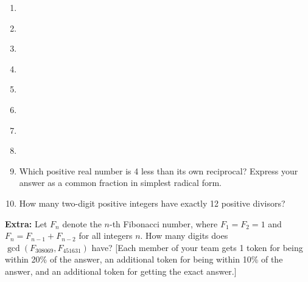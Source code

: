 \documentclass{article}
\begin{document}
\begin{enumerate}
\item \underline{\hspace{3in}}\vspace{1cm}
\item \underline{\hspace{3in}}\vspace{1cm}
\item \underline{\hspace{3in}}\vspace{1cm}
\item \underline{\hspace{3in}}\vspace{1cm}
\item \underline{\hspace{3in}}\vspace{1cm}
\item \underline{\hspace{3in}}\vspace{1cm}
\item \underline{\hspace{3in}}\vspace{1cm}
\item \underline{\hspace{3in}}\vspace{1cm}
\item Which positive real number is 4 less than its own reciprocal? Express your answer as a common fraction in simplest radical form.\vspace{1cm}
\item How many two-digit positive integers have exactly 12 positive divisors?
\end{enumerate}\vspace{1cm}

\textbf{Extra:} Let $F_n$ denote the $n$-th Fibonacci number, where $F_1 = F_2 = 1$ and $F_n = F_{n - 1} + F_{n - 2}$ for all integers $n$. How many digits does $\gcd(F_{308069}, F_{451631})$ have? [Each member of your team gets 1 token for being within 20\% of the answer, an additional token for being within 10\% of the answer, and an additional token for getting the exact answer.]
\end{document}
